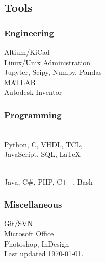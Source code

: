\documentclass[]{resume}
\begin{document}
\begin{facts}
\subsection{Tools}

\subsubsection{Engineering}
Altium/KiCad\\
Linux/Unix Administration\\
Jupyter, Scipy, Numpy, Pandas\\
MATLAB\\
Autodesk Inventor
\sectionsep

\subsubsection{Programming}
\\
Python, C, VHDL, TCL,\\
JavaScript, SQL, LaTeX
\sectionsep

\\
Java, C\#, PHP, C++, Bash
\sectionsep

\subsubsection{Miscellaneous}
Git/SVN\\
Microsoft Office\\
Photoshop, InDesign\\
Last updated \today.

\end{facts}
\end{document}
